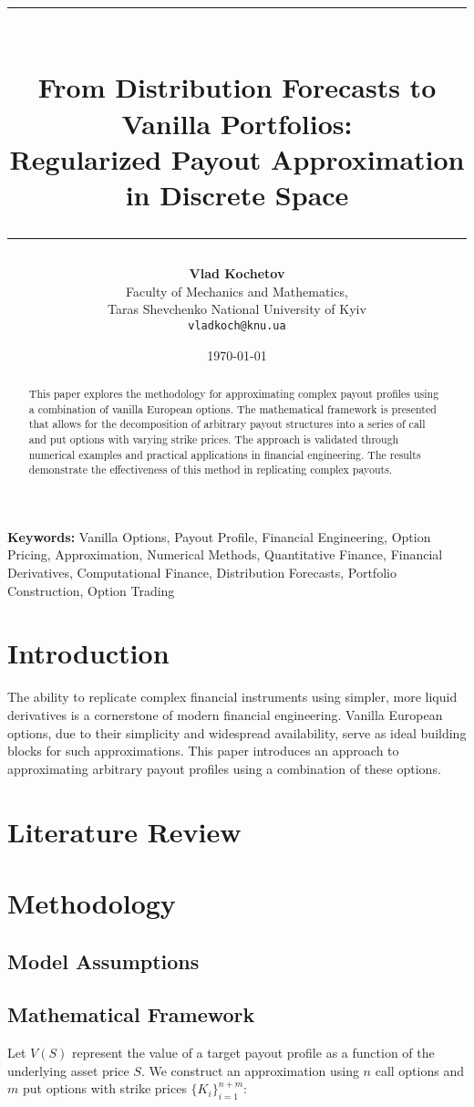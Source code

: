 \documentclass[12pt]{article}
\title{\rule{\textwidth}{4pt}\\
\textbf{From Distribution Forecasts to Vanilla Portfolios: \\[0.2cm]
Regularized Payout Approximation in Discrete Space}\\[0.2cm]
\rule{\textwidth}{2pt}}
\author{\small \textbf{Vlad Kochetov} \\
    \small Faculty of Mechanics and Mathematics, \\
    \small Taras Shevchenko National University of Kyiv \\
    \small \texttt{vladkoch@knu.ua}
}
\date{\today}
\providecommand{\keywords}[1]{\textbf{Keywords:} #1}
\begin{document}
\maketitle

\begin{abstract}
This paper explores the methodology for approximating complex payout profiles using a
combination of vanilla European options. The mathematical framework is presented that
allows for the decomposition of arbitrary payout structures into a series of call and
put options with varying strike prices. The approach is validated through numerical
examples and practical applications in financial engineering. The results demonstrate
the effectiveness of this method in replicating complex payouts.
\end{abstract}

\newpage

\keywords{
    \small{
        Vanilla Options, 
        Payout Profile, 
        Financial Engineering, 
        Option Pricing, 
        Approximation, 
        Numerical Methods,
        Quantitative Finance,
        Financial Derivatives,
        Computational Finance,
        Distribution Forecasts,
        Portfolio Construction,
        Option Trading
    }
}

\section{Introduction}
The ability to replicate complex financial instruments using simpler, more liquid
derivatives is a cornerstone of modern financial engineering. Vanilla European options,
due to their simplicity and widespread availability, serve as ideal building blocks
for such approximations. This paper introduces an approach to approximating arbitrary
payout profiles using a combination of these options.

\section{Literature Review}

\section{Methodology}
\subsection{Model Assumptions}

\subsection{Mathematical Framework}
Let \( V(S) \) represent the value of a target payout profile as a function of the underlying asset price \( S \). We construct an approximation using \( n \) call options and \( m \) put options with strike prices \( \{K_i\}_{i=1}^{n+m} \):
\end{document}
